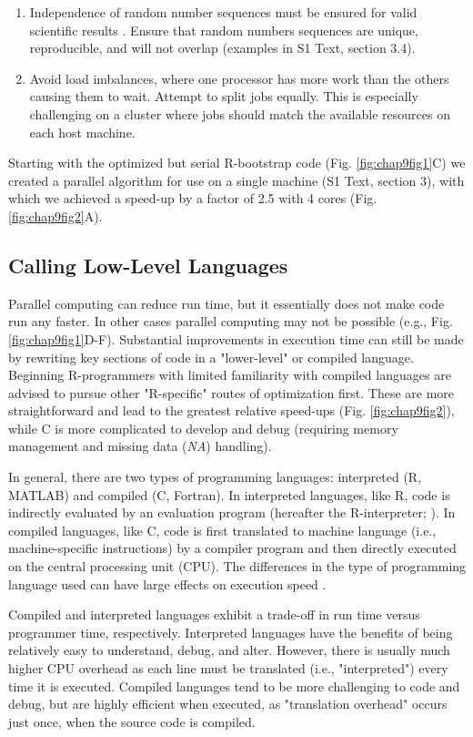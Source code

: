\documentclass[b5paper,justified]{tufte-book} %
\begin{document}
\begin{fullwidth}
\begin{enumerate}
\item Independence of random number sequences must be ensured for valid scientific results \citep[e.g.][]{LEcuyer2012, Grama2003}. Ensure that random numbers sequences are unique, reproducible, and will
not overlap (examples in S1 Text, section 3.4).

\item Avoid load imbalances, where one processor has more work than the others causing them to wait. Attempt to split jobs equally. This is especially challenging on a cluster where jobs should match the available resources on each host machine. 
\end{enumerate}

Starting with the optimized but serial R-bootstrap code (Fig. \ref{fig:chap9fig1}C) we created a parallel algorithm for use on a single machine (S1 Text, section 3), with which we achieved a speed-up by a
factor of 2.5 with 4 cores (Fig. \ref{fig:chap9fig2}A).

\subsection{Calling Low-Level Languages}
Parallel computing can reduce run time, but it essentially does not make code run any faster. In other cases parallel computing may not be possible (e.g., Fig. \ref{fig:chap9fig1}D-F). Substantial improvements in execution time can still be made by rewriting key sections of code in a "lower-level" or compiled language. Beginning R-programmers with limited familiarity with compiled languages are advised to pursue other "R-specific" routes of optimization first. These are more straightforward and lead to the greatest relative speed-ups (Fig. \ref{fig:chap9fig2}), while C is more complicated to develop and debug (requiring memory management and missing data (\emph{NA}) handling). 

In general, there are two types of programming languages: interpreted (R, MATLAB) and compiled (C, Fortran). In interpreted languages, like R, code is indirectly evaluated by an evaluation program (hereafter the R-interpreter; \citealt{Chambers2009}). In compiled languages, like C, code is first translated to machine language (i.e., machine-specific instructions) by a compiler program and then directly executed on the central processing unit (CPU). The differences in the type of programming language used can have large effects on execution speed \citep{Chambers2009}.

Compiled and interpreted languages exhibit a trade-off in run time versus programmer time, respectively. Interpreted languages have the benefits of being relatively easy to understand, debug, and alter. However, there is usually much higher CPU overhead as each line must be translated (i.e., "interpreted") every time it is executed. Compiled languages tend to be more challenging to code and debug, but are highly efficient when executed, as "translation
overhead" occurs just once, when the source code is compiled.


\end{fullwidth}
\end{document}
